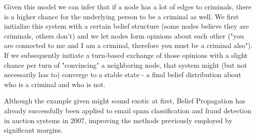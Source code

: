 	Given this model we can infer that if a node has a lot of edges to criminals, there is a higher chance for the underlying person to be a criminal as well. We first initialize this system with a certain belief structure (some nodes believe they are criminals, others don't) and we let nodes form opinions about each other ("you are connected to me and I am a criminal, therefore you must be a criminal also"). If we subsequently initiate a turn-based exchange of those opinions with a slight chance per turn of "convincing" a neighboring node, that system might (but not necessarily has to) converge to a stable state - a final belief distribution about who is a criminal and who is not.
	
	Although the example given might sound exotic at first, Belief Propagation has already successfully been applied to email spam classification and fraud detection in auction systems in 2007, improving the methods previously employed by significant margins.

